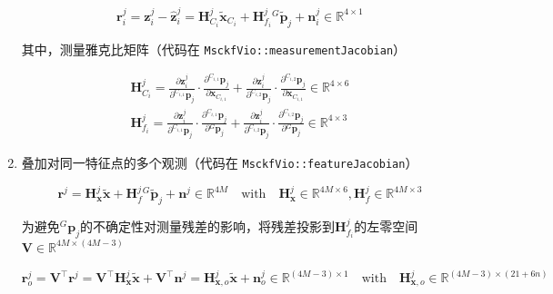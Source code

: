 \documentclass[12pt,a4paper]{article}
\begin{document}
\begin{enumerate}
\begin{equation}
\mathbf{r}^j_i = 
\mathbf{z}_i^j - \hat{\mathbf{z}}_i^j = 
\mathbf{H}_{C_i}^j\tilde{\mathbf{x}}_{C_i} + 
\mathbf{H}_{f_i}^j{}^G\tilde{\mathbf{p}}_{j} + 
\mathbf{n}_i^j
\in \mathbb{R}^{4 \times 1}
\end{equation}

其中，测量雅克比矩阵（代码在 \verb|MsckfVio::measurementJacobian|）

\begin{equation}
\begin{gathered}
\mathbf{H}_{C_i}^j = 
\frac{\partial \mathbf{z}_i^j}{\partial {}^{C_{i,1}}\mathbf{p}_j} \cdot 
\frac{\partial {}^{C_{i,1}}\mathbf{p}_j}{\partial \mathbf{x}_{C_{i,1}}} + 
\frac{\partial \mathbf{z}_i^j}{\partial {}^{C_{i,2}}\mathbf{p}_j} \cdot 
\frac{\partial {}^{C_{i,2}}\mathbf{p}_j}{\partial \mathbf{x}_{C_{i,1}}}
\in \mathbb{R}^{4 \times 6} \\
\mathbf{H}_{f_i}^j = 
\frac{\partial \mathbf{z}_i^j}{\partial {}^{C_{i,1}}\mathbf{p}_j} \cdot 
\frac{\partial {}^{C_{i,1}}\mathbf{p}_j}{\partial {}^G\mathbf{p}_j} +
\frac{\partial \mathbf{z}_i^j}{\partial {}^{C_{i,2}}\mathbf{p}_j} \cdot 
\frac{\partial {}^{C_{i,2}}\mathbf{p}_j}{\partial {}^G\mathbf{p}_j} 
\in \mathbb{R}^{4 \times 3}
\end{gathered}
\end{equation}

{\color{red}{why: Modifty the measurement Jacobian to ensure observability constrain, Ref: OC-VINS}}

\item 叠加对同一特征点的多个观测（代码在 \verb|MsckfVio::featureJacobian|）

\begin{equation*}
\mathbf{r}^j = 
\mathbf{H}_{\mathbf{x}}^j \tilde{\mathbf{x}} + 
\mathbf{H}_f^j {}^G\tilde{\mathbf{p}}_j + 
\mathbf{n}^j \in \mathbb{R}^{4M}
\quad \text{with} \quad
\mathbf{H}_{\mathbf{x}}^j \in \mathbb{R}^{4M \times 6}, 
\mathbf{H}_f^j \in \mathbb{R}^{4M \times 3}
\end{equation*}

为避免${}^G\mathbf{p}_j$的不确定性对测量残差的影响，将残差投影到$\mathbf{H}_{f_i}^j$的左零空间 $\mathbf{V} \in \mathbb{R}^{4M \times (4M-3)}$

\begin{equation}
\mathbf{r}^j_o 
= \mathbf{V}^\top \mathbf{r}^j
= \mathbf{V}^\top \mathbf{H}_{\mathbf{x}}^j\tilde{\mathbf{x}} +
\mathbf{V}^\top \mathbf{n}^j
= \mathbf{H}_{\mathbf{x}, o}^j\tilde{\mathbf{x}} + 
\mathbf{n}^j_o 
\in \mathbb{R}^{(4M-3) \times 1}
\quad \text{with} \quad
\mathbf{H}_{\mathbf{x}, o}^j \in \mathbb{R}^{(4M-3) \times (21+6n)}
\end{equation}


\end{enumerate}
\end{document}
